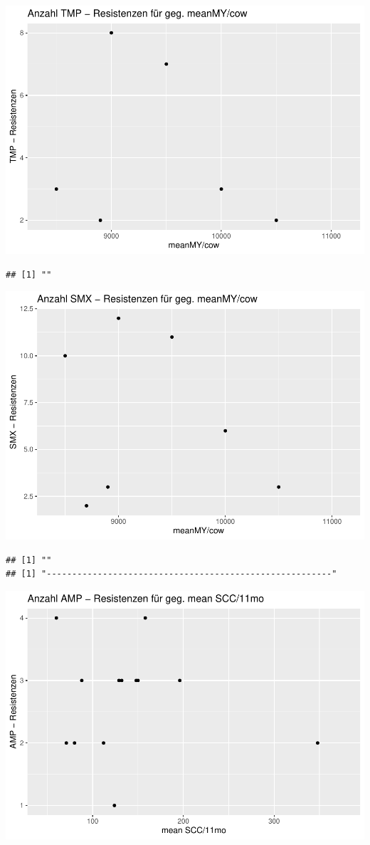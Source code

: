\documentclass[
]{article}
\begin{document}
\includegraphics{NResistenzen_files/figure-latex/unnamed-chunk-6-9.pdf}

\begin{verbatim}
## [1] ""
\end{verbatim}

\includegraphics{NResistenzen_files/figure-latex/unnamed-chunk-6-10.pdf}

\begin{verbatim}
## [1] ""
## [1] "--------------------------------------------------------"
\end{verbatim}

\includegraphics{NResistenzen_files/figure-latex/unnamed-chunk-6-11.pdf}
\end{document}
